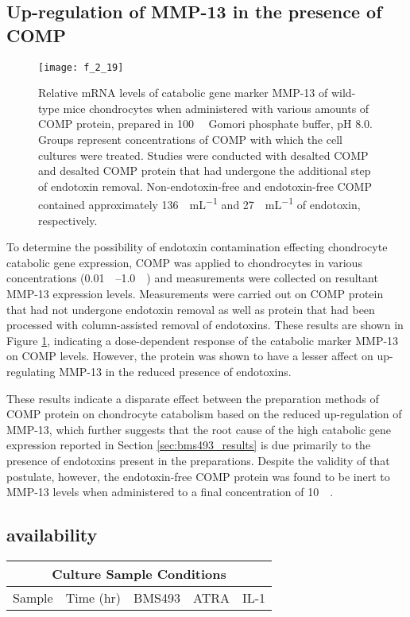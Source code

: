 \begin{refsection}
\subsection{Up-regulation of MMP-13 in the presence of COMP}
\label{sec:mmp13}
\begin{figure}[h!] \centering \texttt{[image: f\_2\_19]}
    \caption{Relative mRNA levels of catabolic gene marker MMP-13 of wild-type mice
    chondrocytes when administered with various amounts of COMP protein,
    prepared in \SI{100}{\milli\moLar} Gomori phosphate buffer, pH 8.0. Groups
    represent concentrations of COMP with which the cell cultures were treated.
    Studies were conducted with desalted COMP and desalted COMP protein that had
    undergone the additional step of endotoxin removal. Non-endotoxin-free and
    endotoxin-free COMP contained approximately \SI{136}{\EU\per\mL} and
    \SI{27}{\EU\per\mL} of endotoxin, respectively.}\label{fig:mmp13}
\end{figure}
To determine the possibility of endotoxin contamination effecting chondrocyte
catabolic gene expression, COMP was applied to chondrocytes in various
concentrations (\SIrange{0.01}{1.0}{\micro\moLar}) and measurements were collected
on resultant MMP-13 expression levels. Measurements were carried out on COMP
protein that had not undergone endotoxin removal as well as protein that had
been processed with column-assisted removal of endotoxins. These results are
shown in Figure \ref{fig:mmp13}, indicating a dose-dependent response of the
catabolic marker MMP-13 on COMP levels. However, the protein was shown to have a
lesser affect on up-regulating MMP-13 in the reduced presence of endotoxins.

These results indicate a disparate effect between the preparation methods of
COMP protein on chondrocyte catabolism based on the reduced up-regulation of
MMP-13, which further suggests that the root cause of the high catabolic gene
expression reported in Section \ref{sec:bms493_results} is due primarily to the
presence of endotoxins present in the preparations. Despite the validity of that
postulate, however, the endotoxin-free COMP protein was found to be inert to
MMP-13 levels when administered to a final concentration of
\SI{10}{\nano\moLar}.

\subsection{ availability}
\begin{table}[h!]
    \centering
\begin{tabular}{ ccccc }
  \hline
  \multicolumn{5}{c}{Culture Sample Conditions} \\
  \hline
  Sample & Time (hr) & BMS493 & ATRA & IL-1 \\
  \hline


\end{tabular}
\end{table}
\end{refsection}
